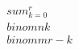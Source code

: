 \documentclass[preview]{standalone}
\begin{document}
\begin{align*}
\quad\\sum_{k=0}^r \quad\\binom{n}{k} \quad\\binom{m}{r-k}
\end{align*}
\end{document}
